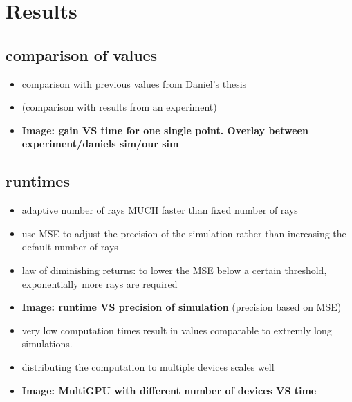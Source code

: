 \documentclass[a4paper,11pt]{article}
\begin{document}
\section{Results}
\subsection{comparison of values}
\begin{itemize}
  \item comparison with previous values from Daniel's thesis
  \item (comparison with results from an experiment)
  \item \textbf{Image: gain VS time for one single point. Overlay between experiment/daniels sim/our sim}
\end{itemize}

\subsection{runtimes}
\begin{itemize}
  \item adaptive number of rays MUCH faster than fixed number of rays
  \item use MSE to adjust the precision of the simulation rather than increasing the default number of rays
  \item law of diminishing returns: to lower the MSE below a certain threshold, exponentially more rays are required
  \item \textbf{Image: runtime VS precision of simulation} (precision based on MSE)
  \item very low computation times result in values comparable to extremly long simulations.
  \item distributing the computation to multiple devices scales well
  \item \textbf{Image: MultiGPU with different number of devices VS time}
\end{itemize}
\end{document}
